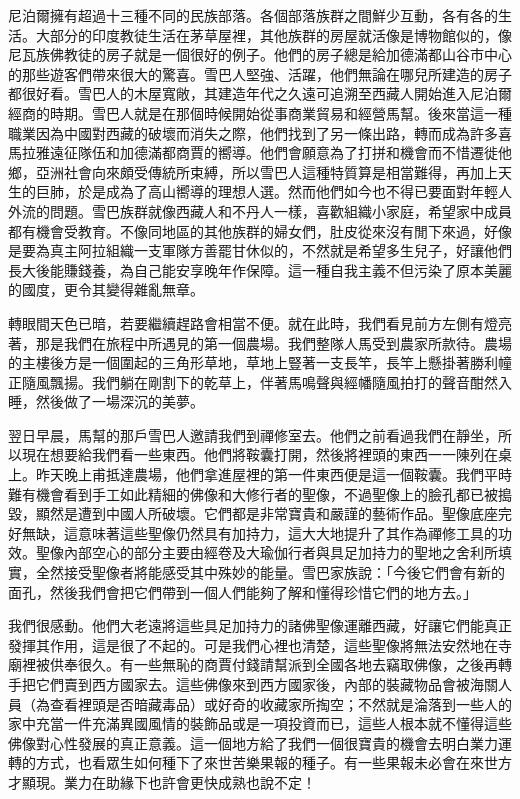 尼泊爾擁有超過十三種不同的民族部落。各個部落族群之間鮮少互動，各有各的生活。大部分的印度教徒生活在茅草屋裡，其他族群的房屋就活像是博物館似的，像尼瓦族佛教徒的房子就是一個很好的例子。他們的房子總是給加德滿都山谷市中心的那些遊客們帶來很大的驚喜。雪巴人堅強、活躍，他們無論在哪兒所建造的房子都很好看。雪巴人的木屋寬敞，其建造年代之久遠可追溯至西藏人開始進入尼泊爾經商的時期。雪巴人就是在那個時候開始從事商業貿易和經營馬幫。後來當這一種職業因為中國對西藏的破壞而消失之際，他們找到了另一條出路，轉而成為許多喜馬拉雅遠征隊伍和加德滿都商賈的嚮導。他們會願意為了打拼和機會而不惜遷徙他鄉，亞洲社會向來頗受傳統所束縛，所以雪巴人這種特質算是相當難得，再加上天生的巨肺，於是成為了高山嚮導的理想人選。然而他們如今也不得已要面對年輕人外流的問題。雪巴族群就像西藏人和不丹人一樣，喜歡組織小家庭，希望家中成員都有機會受教育。不像同地區的其他族群的婦女們，肚皮從來沒有閒下來過，好像是要為真主阿拉組織一支軍隊方善罷甘休似的，不然就是希望多生兒子，好讓他們長大後能賺錢養，為自己能安享晚年作保障。這一種自我主義不但污染了原本美麗的國度，更令其變得雜亂無章。

轉眼間天色已暗，若要繼續趕路會相當不便。就在此時，我們看見前方左側有燈亮著，那是我們在旅程中所遇見的第一個農場。我們整隊人馬受到農家所款待。農場的主樓後方是一個圍起的三角形草地，草地上豎著一支長竿，長竿上懸掛著勝利幢正隨風飄揚。我們躺在剛割下的乾草上，伴著馬鳴聲與經幡隨風拍打的聲音酣然入睡，然後做了一場深沉的美夢。

翌日早晨，馬幫的那戶雪巴人邀請我們到禪修室去。他們之前看過我們在靜坐，所以現在想要給我們看一些東西。他們將鞍囊打開，然後將裡頭的東西一一陳列在桌上。昨天晚上甫抵達農場，他們拿進屋裡的第一件東西便是這一個鞍囊。我們平時難有機會看到手工如此精細的佛像和大修行者的聖像，不過聖像上的臉孔都已被搗毀，顯然是遭到中國人所破壞。它們都是非常寶貴和嚴謹的藝術作品。聖像底座完好無缺，這意味著這些聖像仍然具有加持力，這大大地提升了其作為禪修工具的功效。聖像內部空心的部分主要由經卷及大瑜伽行者與具足加持力的聖地之舍利所填實，全然接受聖像者將能感受其中殊妙的能量。雪巴家族說：「今後它們會有新的面孔，然後我們會把它們帶到一個人們能夠了解和懂得珍惜它們的地方去。」

我們很感動。他們大老遠將這些具足加持力的諸佛聖像運離西藏，好讓它們能真正發揮其作用，這是很了不起的。可是我們心裡也清楚，這些聖像將無法安然地在寺廟裡被供奉很久。有一些無恥的商賈付錢請幫派到全國各地去竊取佛像，之後再轉手把它們賣到西方國家去。這些佛像來到西方國家後，內部的裝藏物品會被海關人員（為查看裡頭是否暗藏毒品）或好奇的收藏家所掏空；不然就是淪落到一些人的家中充當一件充滿異國風情的裝飾品或是一項投資而已，這些人根本就不懂得這些佛像對心性發展的真正意義。這一個地方給了我們一個很寶貴的機會去明白業力運轉的方式，也看眾生如何種下了來世苦樂果報的種子。有一些果報未必會在來世方才顯現。業力在助緣下也許會更快成熟也說不定！

